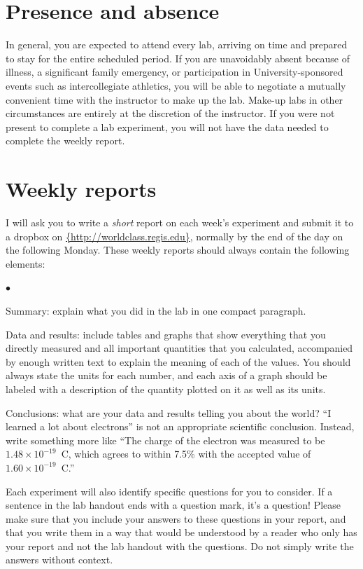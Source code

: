 \documentclass[11pt]{article}
\newcommand{\squishlist}{
   \begin{list}{$\bullet$}
    { \setlength{\itemsep}{0pt}      \setlength{\parsep}{3pt}
      \setlength{\topsep}{3pt}       \setlength{\partopsep}{0pt}
      \setlength{\leftmargin}{1.5em} \setlength{\labelwidth}{1em}
      \setlength{\labelsep}{0.5em} } }
\newcommand{\squishend}{
    \end{list}  }
\begin{document}
\section{Presence and absence}

In general, you are expected to attend every lab, arriving on time and prepared to stay for the entire scheduled period.
If you are unavoidably absent because of illness, a significant family emergency, or participation in University-sponsored
events such as intercollegiate athletics, you will be able to negotiate a mutually convenient time with the instructor to make up 
the lab.  Make-up labs in other circumstances are entirely at the discretion of the instructor.  If you were not present to
complete a lab experiment, you will not have the data needed to complete the weekly report.

\section{Weekly reports}

I will ask you to write a {\em short} report on each week's experiment and 
submit it to a dropbox on \url{{http://worldclass.regis.edu}},
normally by the end of the day on the following Monday.
These weekly reports should always contain the following elements:
\squishlist
\item Summary: explain what you did in the lab in one compact paragraph.
\item Data and results: include tables and graphs that show everything 
  that you directly measured and all important quantities that you calculated,
  accompanied by enough written text to explain the meaning of each of the 
  values.  You should always state the units for each number, and each axis 
  of a graph should be labeled with a description of the quantity plotted on 
  it as well as its units.
\item Conclusions: what are your data and results telling you about the world?
  ``I learned a lot about electrons'' is not an appropriate scientific conclusion.  
  Instead, write something more like ``The charge of the electron was measured to be $1.48 \times 10^{-19}$~C, which agrees to within 7.5\% with the accepted value of $1.60 \times 10^{-19}$~C.''
\squishend

Each experiment will also identify specific questions for you to consider.  
If a sentence in the lab handout ends with a question mark, it's a question!
Please make sure that you include your answers to these questions in your 
report, and that you write them in a way that would be understood by a reader 
who only has your report and not the lab handout with the questions.
Do not simply write the answers without context.
\end{document}
